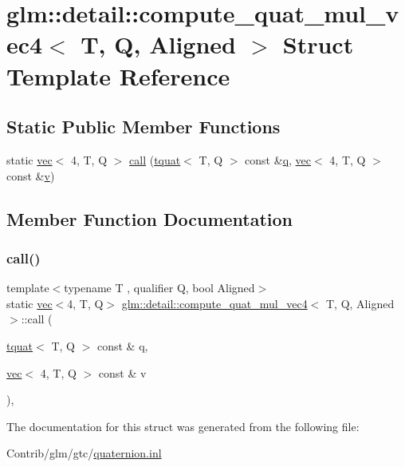 \hypertarget{structglm_1_1detail_1_1compute__quat__mul__vec4}{}\section{glm\+:\+:detail\+:\+:compute\+\_\+quat\+\_\+mul\+\_\+vec4$<$ T, Q, Aligned $>$ Struct Template Reference}
\label{structglm_1_1detail_1_1compute__quat__mul__vec4}
\subsection*{Static Public Member Functions}
\begin{DoxyCompactItemize}
\item 
static \mbox{\hyperlink{structglm_1_1vec}{vec}}$<$ 4, T, Q $>$ \mbox{\hyperlink{structglm_1_1detail_1_1compute__quat__mul__vec4_a5482b25b24a73e5a7a522f771e0045b0}{call}} (\mbox{\hyperlink{structglm_1_1tquat}{tquat}}$<$ T, Q $>$ const \&\mbox{\hyperlink{_s_d_l__opengl_8h_a8fc1e7b9baaae687804c7eed46ca09c6}{q}}, \mbox{\hyperlink{structglm_1_1vec}{vec}}$<$ 4, T, Q $>$ const \&\mbox{\hyperlink{_s_d_l__opengl_8h_a10a82eabcb59d2fcd74acee063775f90}{v}})
\end{DoxyCompactItemize}


\subsection{Member Function Documentation}
\mbox{\label{structglm_1_1detail_1_1compute__quat__mul__vec4_a5482b25b24a73e5a7a522f771e0045b0}} 
\subsubsection{\texorpdfstring{call()}{call()}}
{\footnotesize\ttfamily template$<$typename T , qualifier Q, bool Aligned$>$ \\
static \mbox{\hyperlink{structglm_1_1vec}{vec}}$<$4, T, Q$>$ \mbox{\hyperlink{structglm_1_1detail_1_1compute__quat__mul__vec4}{glm\+::detail\+::compute\+\_\+quat\+\_\+mul\+\_\+vec4}}$<$ T, Q, Aligned $>$\+::call (\begin{DoxyParamCaption}\item[{\mbox{\hyperlink{structglm_1_1tquat}{tquat}}$<$ T, Q $>$ const \&}]{q,  }\item[{\mbox{\hyperlink{structglm_1_1vec}{vec}}$<$ 4, T, Q $>$ const \&}]{v }\end{DoxyParamCaption})\hspace{0.3cm}{\ttfamily [inline]}, {\ttfamily [static]}}



The documentation for this struct was generated from the following file\+:\begin{DoxyCompactItemize}
\item 
Contrib/glm/gtc/\mbox{\hyperlink{gtc_2quaternion_8inl}{quaternion.\+inl}}\end{DoxyCompactItemize}
